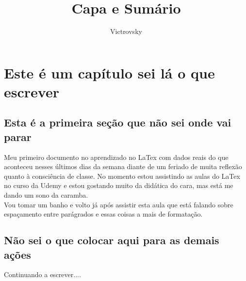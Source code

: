 \documentclass{book}
\begin{document}
	\title{\textbf{{\Huge Capa e Sumário}}} %
	\author{Victrovsky} %
	\maketitle %
	\newpage
	\tableofcontents %
	\newpage
	\chapter{Este é um capítulo sei lá o que escrever}
	\section{Esta é a primeira seção que não sei onde vai parar}
	\begin{doublespace}
		Meu primeiro documento no aprendizado no LaTex com dados reais do que aconteceu nesses últimos dias da semana diante de um feriado de muita reflexão quanto à consciência de classe.
		No momento estou assistindo as aulas do LaTex no curso da Udemy e estou gostando muito da didática do cara, mas está me dando um sono da caramba. 
		\\
		Vou tomar um banho e volto já após assistir esta aula que está falando sobre espaçamento entre parágrados e essas coisas a mais de formatação.
		\\
		
	\end{doublespace}
	
	\section{Não sei o que colocar aqui para as demais ações}
	
	Continuando a escrever....
	
\end{document}
